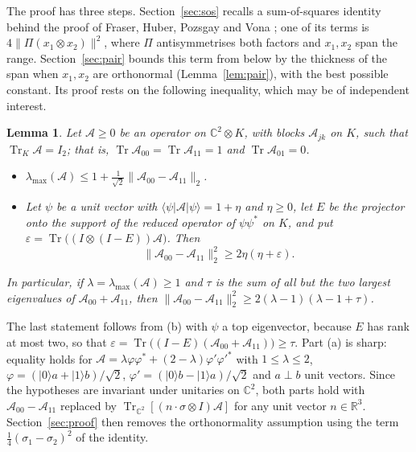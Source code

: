 \documentclass[11pt]{article}
\newtheorem{lemma}[theorem]{Lemma}
\theoremstyle{remark}
\newcommand{\Tr}{\operatorname{Tr}}
\newcommand{\norm}[1]{\lVert #1\rVert}
\begin{document}
The proof has three steps. Section~\ref{sec:sos} recalls a sum-of-squares identity behind the proof of
Fraser, Huber, Pozsgay and Vona \cite{FHPV}; one of its terms is $4\norm{\Pi(x_1\otimes x_2)}^2$, where $\Pi$
antisymmetrises both factors and $x_1,x_2$ span the range. Section~\ref{sec:pair} bounds this term from below by the
thickness of the span when $x_1,x_2$ are orthonormal (Lemma~\ref{lem:pair}), with the best possible constant. Its proof
rests on the following inequality, which may be of independent interest.

\begin{lemma}\label{lem:qubit}
Let $\mathcal A\ge0$ be an operator on $\mathbb C^2\otimes K$, with blocks $\mathcal A_{jk}$ on $K$, such that
$\Tr_K\mathcal A=I_2$; that is, $\Tr\mathcal A_{00}=\Tr\mathcal A_{11}=1$ and $\Tr\mathcal A_{01}=0$.
\begin{itemize}
\item[(a)] $\lambda_{\max}(\mathcal A)\le1+\tfrac1{\sqrt2}\norm{\mathcal A_{00}-\mathcal A_{11}}_2$.
\item[(b)] Let $\psi$ be a unit vector with $\langle\psi|\mathcal A|\psi\rangle=1+\eta$ and $\eta\ge0$, let $E$ be the
projector onto the support of the reduced operator of $\psi\psi^*$ on $K$, and put
$\varepsilon=\Tr\big((I\otimes(I-E))\mathcal A\big)$. Then
\[
\norm{\mathcal A_{00}-\mathcal A_{11}}_2^2\ge2\eta(\eta+\varepsilon).
\]
\end{itemize}
In particular, if $\lambda=\lambda_{\max}(\mathcal A)\ge1$ and $\tau$ is the sum of all but the two largest eigenvalues
of $\mathcal A_{00}+\mathcal A_{11}$, then $\norm{\mathcal A_{00}-\mathcal A_{11}}_2^2\ge2(\lambda-1)(\lambda-1+\tau)$.
\end{lemma}

The last statement follows from (b) with $\psi$ a top eigenvector, because $E$ has rank at most two, so that
$\varepsilon=\Tr\big((I-E)(\mathcal A_{00}+\mathcal A_{11})\big)\ge\tau$. Part (a) is sharp: equality holds for
$\mathcal A=\lambda\varphi\varphi^*+(2-\lambda)\varphi'\varphi'^*$ with
$1\le\lambda\le2$, $\varphi=(|0\rangle a+|1\rangle b)/\sqrt2$, $\varphi'=(|0\rangle b-|1\rangle a)/\sqrt2$ and $a\perp b$
unit vectors. Since the hypotheses are invariant under unitaries on $\mathbb C^2$, both parts hold with
$\mathcal A_{00}-\mathcal A_{11}$ replaced by $\Tr_{\mathbb C^2}[(n\cdot\sigma\otimes I)\mathcal A]$ for any unit vector
$n\in\mathbb R^3$. Section~\ref{sec:proof} then
removes the orthonormality assumption using the term $\frac14(\sigma_1-\sigma_2)^2$ of the identity.
\end{document}
